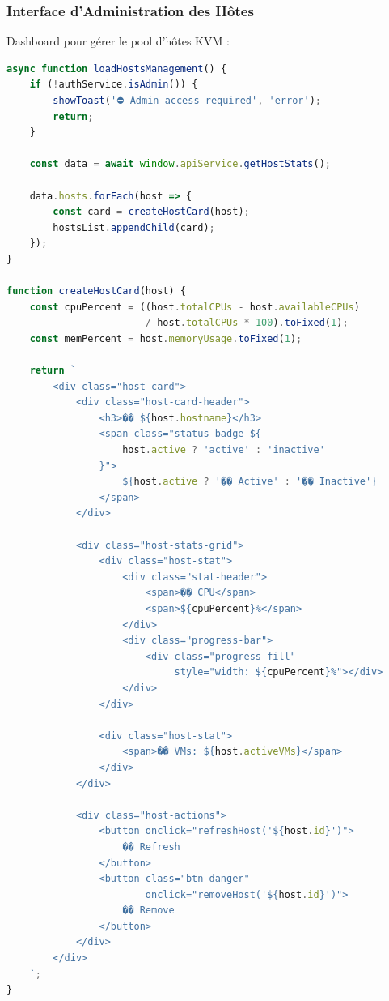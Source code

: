\documentclass[12pt,a4paper]{article}
\begin{document}
\subsubsection{Interface d'Administration des Hôtes}

Dashboard pour gérer le pool d'hôtes KVM :

\begin{lstlisting}[language=JavaScript,caption=Gestion hôtes (hosts.js)]
async function loadHostsManagement() {
    if (!authService.isAdmin()) {
        showToast('⛔ Admin access required', 'error');
        return;
    }
    
    const data = await window.apiService.getHostStats();
    
    data.hosts.forEach(host => {
        const card = createHostCard(host);
        hostsList.appendChild(card);
    });
}

function createHostCard(host) {
    const cpuPercent = ((host.totalCPUs - host.availableCPUs) 
                        / host.totalCPUs * 100).toFixed(1);
    const memPercent = host.memoryUsage.toFixed(1);
    
    return `
        <div class="host-card">
            <div class="host-card-header">
                <h3>��️ ${host.hostname}</h3>
                <span class="status-badge ${
                    host.active ? 'active' : 'inactive'
                }">
                    ${host.active ? '�� Active' : '�� Inactive'}
                </span>
            </div>
            
            <div class="host-stats-grid">
                <div class="host-stat">
                    <div class="stat-header">
                        <span>�� CPU</span>
                        <span>${cpuPercent}%</span>
                    </div>
                    <div class="progress-bar">
                        <div class="progress-fill" 
                             style="width: ${cpuPercent}%"></div>
                    </div>
                </div>
                
                <div class="host-stat">
                    <span>��️ VMs: ${host.activeVMs}</span>
                </div>
            </div>
            
            <div class="host-actions">
                <button onclick="refreshHost('${host.id}')">
                    �� Refresh
                </button>
                <button class="btn-danger" 
                        onclick="removeHost('${host.id}')">
                    ��️ Remove
                </button>
            </div>
        </div>
    `;
}
\end{lstlisting}
\end{document}
